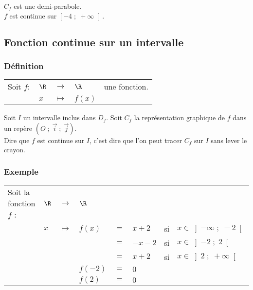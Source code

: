\vspace*{.3cm}

$C_f$ est une demi-parabole. \\

$f$ est continue sur $\left[-4 \; ; \; +\infty\right[$.

\newpage

\subsection{Fonction continue sur un intervalle}

\subsubsection{Définition}

\begin{tabular}{lllll}
\hspace{-.3cm} Soit $f:$ & $\R$ & $\longrightarrow$ & $\R$ & une fonction. \\
& $x$ & $\longmapsto$ & $f(x)$ & \\
\end{tabular}

\vspace*{.3cm}

Soit $I$ un intervalle inclus dans $D_f$. Soit $C_f$ la représentation graphique de $f$ dans un repère $\left(O \; ; \; \overrightarrow{i} \; ; \; \overrightarrow{j}\right)$. \\
Dire que $f$ est continue sur $I$, c'est dire que l'on peut tracer $C_f$ sur $I$ sans lever le crayon.

\subsubsection{Exemple }

\begin{tabular}{llllllll}
\hspace{-.3cm} Soit la fonction $f$ : & $\R$ & $\longrightarrow$ & $\R$ & & & & \\
& $x$ & $\longmapsto$ & $f\left(x\right)$ & $ = $ & $ x + 2$ & si & $x \in \left]-\infty \; ; \; -2\right[$ \\
& & & & $=$ & $-x - 2$ &  si & $x \in \left]-2 \; ; \; 2\right[$ \\
& & & & $=$ & $x + 2$ &  si & $x \in \left]2 \; ; \; +\infty\right[$ \\
& & & $f\left(-2\right)$ & $=$ & $0$ \\
& & & $f\left(2\right)$ & $=$ & $0$ \\
\end{tabular}


